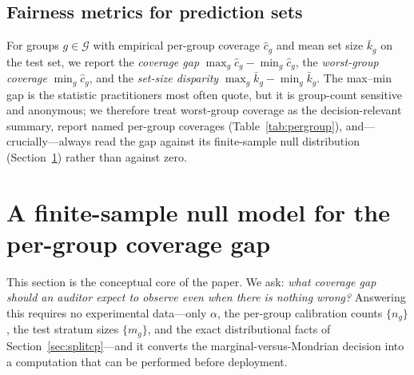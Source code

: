\documentclass[review,12pt]{elsarticle}
\begin{document}
\subsection{Fairness metrics for prediction sets}
For groups $g \in \mathcal{G}$ with empirical per-group coverage $\hat c_g$ and mean set size $\bar k_g$ on the test set, we report the \emph{coverage gap} $\max_g \hat c_g - \min_g \hat c_g$, the \emph{worst-group coverage} $\min_g \hat c_g$, and the \emph{set-size disparity} $\max_g \bar k_g - \min_g \bar k_g$. The max--min gap is the statistic practitioners most often quote, but it is group-count sensitive and anonymous; we therefore treat worst-group coverage as the decision-relevant summary, report named per-group coverages (Table~\ref{tab:pergroup}), and---crucially---always read the gap against its finite-sample null distribution (Section~\ref{sec:theory}) rather than against zero.

\section{A finite-sample null model for the per-group coverage gap}
\label{sec:theory}

This section is the conceptual core of the paper. We ask: \emph{what coverage gap should an auditor expect to observe even when there is nothing wrong?} Answering this requires no experimental data---only $\alpha$, the per-group calibration counts $\{n_g\}$, the test stratum sizes $\{m_g\}$, and the exact distributional facts of Section~\ref{sec:splitcp}---and it converts the marginal-versus-Mondrian decision into a computation that can be performed before deployment.
\end{document}
